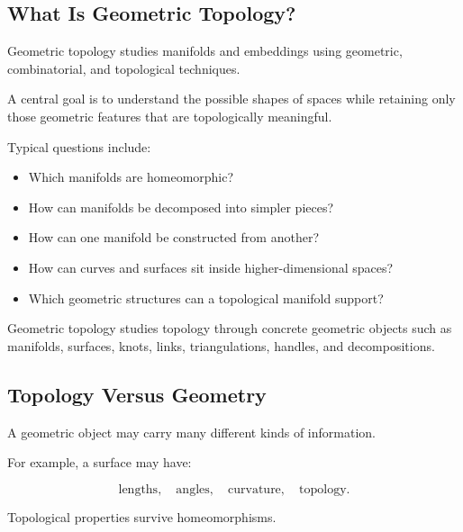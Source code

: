 \subsection{What Is Geometric Topology?}
\label{subsec:what-is-geometric-topology}

Geometric topology studies manifolds and embeddings using geometric,
combinatorial, and topological techniques.

A central goal is to understand the possible shapes of spaces while
retaining only those geometric features that are topologically meaningful.

Typical questions include:

\begin{itemize}
    \item Which manifolds are homeomorphic?
    \item How can manifolds be decomposed into simpler pieces?
    \item How can one manifold be constructed from another?
    \item How can curves and surfaces sit inside higher-dimensional spaces?
    \item Which geometric structures can a topological manifold support?
\end{itemize}

\begin{conceptbox}
Geometric topology studies topology through concrete geometric objects such
as manifolds, surfaces, knots, links, triangulations, handles, and
decompositions.
\end{conceptbox}

\subsection{Topology Versus Geometry}
\label{subsec:topology-versus-geometry-geometric}

A geometric object may carry many different kinds of information.

For example, a surface may have:

\[
\boxed{
\text{lengths},
\quad
\text{angles},
\quad
\text{curvature},
\quad
\text{topology}.
}
\]

Topological properties survive homeomorphisms.

